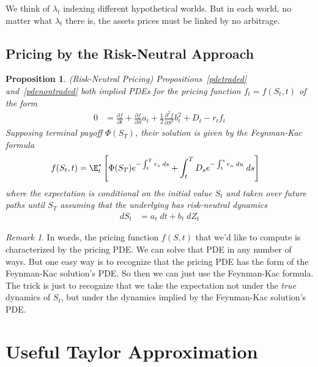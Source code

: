 \documentclass[12pt]{article}
\theoremstyle{plain}
\newtheorem{prop}[thm]{Proposition}
\theoremstyle{definition}
\theoremstyle{remark}
\newtheorem*{rmk}{Remark}
\begin{document}
We think of $\lambda_t$ indexing different hypothetical worlds. But in
each world, no matter what $\lambda_t$ there is, the assets prices must
be linked by no arbitrage.


\clearpage
\subsection{Pricing by the Risk-Neutral Approach}

\begin{prop}\emph{(Risk-Neutral Pricing)}
Propositions~\ref{pdetraded} and~\ref{pdenontraded} both implied
PDEs for the pricing function $f_t=f(S_t,t)$ of the form
\begin{align*}
  0
  &=
  \frac{\partial f}{\partial t}
  +
  \frac{\partial f}{\partial S}
  a_t
  +
  \frac{1}{2}
  \frac{\partial^2 f}{\partial S^2}
  b_t^2
  +
  D_t
  -
  r_t
  f_t
\end{align*}
Supposing terminal payoff $\Phi(S_T)$, their solution is given by the
Feynman-Kac formula
\begin{align*}
  f(S_t,t)
  &=
  \E^*_t\left[
    \Phi(S_T)
    e^{-\int_t^T r_s\;ds}
    +
    \int_t^T
    D_s
    e^{-\int_t^s r_u\;du}
    \;ds
  \right]
\end{align*}
where the expectation is conditional on the initial value $S_t$ and
taken over future paths until $S_T$ assuming that the underlying has
\emph{risk-neutral dynamics}
\begin{align*}
  dS_t
  &= a_t\;dt + b_t\;dZ_t
\end{align*}
\end{prop}
\begin{rmk}
In words, the pricing function $f(S,t)$ that we'd like to compute is
characterized by the pricing PDE.
We can solve that PDE in any number of ways.
But one easy way is to recognize that the pricing PDE has the form of
the Feynman-Kac solution's PDE.
So then we can just use the Feynman-Kac formula.
The trick is just to recognize that we take the expectation not under
the \emph{true} dynamics of $S_t$, but under the dynamics implied by the
Feynman-Kac solution's PDE.
\end{rmk}




\clearpage




\newpage
\appendix

\clearpage
\section{Useful Taylor Approximation}
\end{document}
